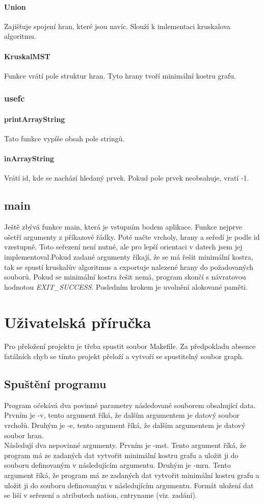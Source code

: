 \documentclass[12pt, a4paper]{report}
\begin{document}
\subsubsection{Union}
Zajišťuje spojení hran, které jsou navíc. Slouží k imlementaci kruskalova algoritmu.
%
%
%
\subsubsection{KruskalMST}
Funkce vrátí pole struktur hran. Tyto hrany tvoří minimální kostru grafu.
%
%
%
%
\subsection{usefc}
%
%
%
\subsubsection{printArrayString}
Tato funkce vypíše obsah pole stringů.
%
%
%
\subsubsection{inArrayString}
Vrátí id, kde se nachází hledaný prvek. Pokud pole prvek neobsahuje, vratí -1.
%
%
%
\section{main}
Ještě zbývá funkce main, která je vstupním bodem aplikace. Funkce nejprve ošetří argumenty z příkazové řádky. Poté načte vrcholy, hrany a seředí je podle id vzestupně. Toto seřezení není nutné, ale pro lepší orientaci v datech jsem jej implementoval.Pokud zadané argumenty říkají, že se má řešit minimální kostra, tak se spustí kruskalův algoritmus a exportuje nalezené hrany do požadovaných souborů. Pokud se minimální kostra řešit nemá, program skončí s návratovou hodnotou \emph{EXIT\_SUCCESS}. Posledním krokem je uvolnění alokované paměti.
%
%
%
%
%
\chapter{Uživatelská příručka}
Pro přeložení projektu je třeba spustit soubor Makefile. Za předpokladu absence fatálních chyb se tímto projekt přeloží a vytvoří se spustitelný soubor graph. 
\section{Spuštění programu}
Program očekává dva povinné parametry následované souborem obsahující data. Prvním je -v, tento argument říká, že dalším argumentem je datový soubor vrcholů. Druhým je -e, tento argument říká, že dalším argumentem je datový soubor hran.\\
Následují dva nepovinné argumenty. Prvním je -mst. Tento argument říká, že program má ze zadaných dat vytvořit minimální kostru grafu a uložit ji do souboru definovaným v následujícím argumentu. Druhým je -mrn. Tento argument říká, že program má ze zadaných dat vytvořit minimální kostru grafu a uložit ji do souboru definovaným v následujícím argumentu. Formát uložení dat se liší v seřezení a atributech nation, cntryname (viz. zadání).
\end{document}
